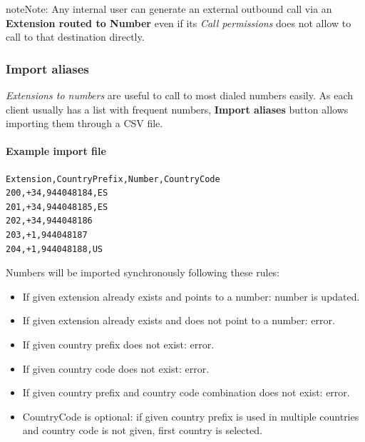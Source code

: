\documentclass[letterpaper,10pt,english]{sphinxmanual}
\begin{document}
\begin{notice}{note}{Note:}
Any internal user can generate an external outbound call via an \textbf{Extension
routed to Number} even if its \emph{Call permissions} does not allow to
call to that destination directly.
\end{notice}


\subsubsection{Import aliases}
\label{administration_portal/client/vpbx/extensions:import-aliases}
\emph{Extensions to numbers} are useful to call to most dialed numbers easily. As each
client usually has a list with frequent numbers, \textbf{Import aliases} button allows
importing them through a CSV file.
\paragraph{Example import file}

\begin{Verbatim}[commandchars=\\\{\}]
Extension,CountryPrefix,Number,CountryCode
200,+34,944048184,ES
201,+34,944048185,ES
202,+34,944048186
203,+1,944048187
204,+1,944048188,US
\end{Verbatim}

Numbers will be imported synchronously following these rules:
\begin{itemize}
\item {} 
If given extension already exists and points to a number: number is updated.

\item {} 
If given extension already exists and does not point to a number: error.

\item {} 
If given country prefix does not exist: error.

\item {} 
If given country code does not exist: error.

\item {} 
If given country prefix and country code combination does not exist: error.

\item {} 
CountryCode is optional: if given country prefix is used in multiple countries
and country code is not given, first country is selected.

\end{itemize}
\end{document}
